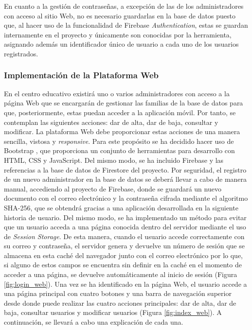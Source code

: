En cuanto a la gestión de contraseñas, a excepción de las de los administradores con acceso al sitio Web, no es necesario guardarlas en la base de datos  puesto que, al hacer uso de la funcionalidad de Firebase \textit{Authentication}, estas se guardan internamente en el proyecto y únicamente son conocidas por la herramienta, asignando además un identificador único de usuario a cada uno de los usuarios registrados.

\subsubsection{Implementación de la Plataforma Web}
En el centro educativo existirá uno o varios administradores con acceso a la página Web que se encargarán de gestionar las familias de la base de datos para que, posteriormente, estas puedan acceder a la aplicación móvil. Por tanto, se contemplan las siguientes acciones: dar de alta, dar de baja, consultar y modificar. La plataforma Web debe proporcionar estas acciones de una manera sencilla, vistosa y \textit{responsive}. Para este propósito se ha decidido hacer uso de Bootstrap \cite{Bootstrap}, que proporciona un conjunto de herramientas para desarrollo con HTML, CSS y JavaScript. Del mismo modo, se ha incluido Firebase y las referencias a la base de datos de Firestore del proyecto. Por seguridad, el registro de un nuevo administrador en la base de datos se deberá llevar a cabo de manera manual, accediendo al proyecto de Firebase, donde se guardará un nuevo documento con el correo electrónico y la contraseña cifrada mediante el algoritmo SHA-256, que se obtendrá gracias a una aplicación desarrollada en la siguiente historia de usuario. Del mismo modo, se ha implementado un método para evitar que un usuario acceda a una página conocida dentro del servidor mediante el uso de \textit{Session Storage}. De esta manera, cuando el usuario accede correctamente con su correo y contraseña, el servidor genera y devuelve un número de sesión que se almacena en esta caché del navegador junto con el correo electrónico por lo que, si alguno de estos campos se encuentra sin definir en la caché en el momento de acceder a una página, se devuelve automáticamente al inicio de sesión (Figura \ref{fig:login_web}). Una vez se ha identificado en la página Web, el usuario accede a una página principal con cuatro botones y una barra de navegación superior desde donde puede realizar las cuatro acciones principales: dar de alta, dar de baja, consultar usuarios y modificar usuarios (Figura \ref{fig:index_web}). A continuación, se llevará a cabo una explicación de cada una.

